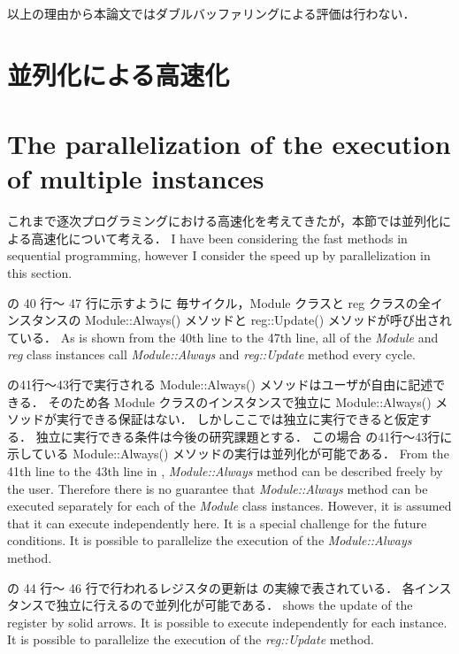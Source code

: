 以上の理由から本論文ではダブルバッファリングによる評価は行わない．

\fi

\section{並列化による高速化} \label{ss:parallel}
\fi
\section{The parallelization of the execution of multiple instances} \label{ss:parallel}

これまで逐次プログラミングにおける高速化を考えてきたが，本節では並列化による高速化について考える．
\fi
I have been considering the fast methods in sequential programming,
however I consider the speed up by parallelization in this section.

 の 40 行〜 47 行に示すように
毎サイクル，Module クラスと reg クラスの全インスタンスの Module::Always() メソッドと reg::Update() メソッドが呼び出されている．
\fi
As  is shown from the 40th line to the 47th line,
all of the \textit{Module} and \textit{reg} class instances
call \textit{Module::Always} and \textit{reg::Update} method every cycle.

 の41行〜43行で実行される Module::Always() メソッドはユーザが自由に記述できる．
そのため各 Module クラスのインスタンスで独立に Module::Always() メソッドが実行できる保証はない．
しかしここでは独立に実行できると仮定する．
独立に実行できる条件は今後の研究課題とする．
この場合 の41行〜43行に示している Module::Always() メソッドの実行は並列化が可能である．
\fi
From the 41th line to the 43th line in ,
\textit{Module::Always} method can be described freely by the user.
Therefore there is no guarantee that \textit{Module::Always} method can be executed separately for each of the \textit{Module} class instances.
However, it is assumed that it can execute independently here.
It is a special challenge for the future conditions.
It is possible to parallelize the execution of the \textit{Module::Always} method.

 の 44 行〜 46 行で行われるレジスタの更新は の実線で表されている．
各インスタンスで独立に行えるので並列化が可能である．
\fi
{} shows the update of the register by solid arrows.
It is possible to execute independently for each instance.
It is possible to parallelize the execution of the \textit{reg::Update} method.

